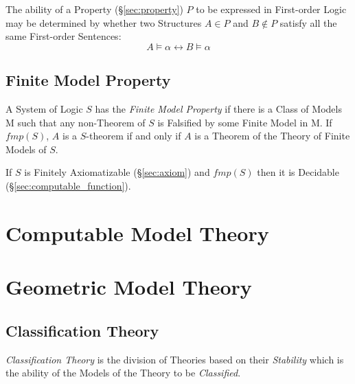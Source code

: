 The ability of a Property (\S\ref{sec:property}) $P$ to be expressed
in First-order Logic may be determined by whether two Structures $A
\in P$ and $B \notin P$ satisfy all the same First-order Sentences:
\[
    A \vDash \alpha \leftrightarrow B \vDash \alpha
\]



\subsection{Finite Model Property}\label{sec:finite_model_property}

A System of Logic $S$ has the \emph{Finite Model Property} if there is
a Class of Models $\mathrm{M}$ such that any non-Theorem of $S$ is
Falsified by some Finite Model in $\mathrm{M}$. If $fmp(S)$, $A$ is a
$S$-theorem if and only if $A$ is a Theorem of the Theory of Finite
Models of $S$.

If $S$ is Finitely Axiomatizable (\S\ref{sec:axiom}) and $fmp(S)$ then
it is Decidable (\S\ref{sec:computable_function}).



\section{Computable Model Theory}\label{sec:computable_model}
\cite{harizanov98}




\section{Geometric Model Theory}\label{sec:geometric_model}

\subsection{Classification Theory}\label{sec:classification_theory}

\emph{Classification Theory} is the division of Theories based on
their \emph{Stability} which is the ability of the Models of the
Theory to be \emph{Classified}.



